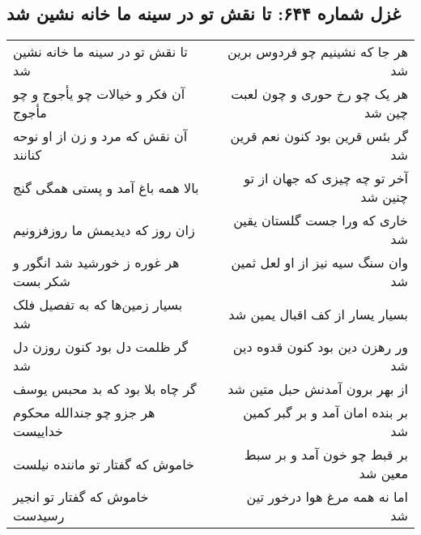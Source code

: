 \begin{center}
\section*{غزل شماره ۶۴۴: تا نقش تو در سینه ما خانه نشین شد}
\label{sec:0644}
\begin{longtable}{l p{0.5cm} r}
تا نقش تو در سینه ما خانه نشین شد
&&
هر جا که نشینیم چو فردوس برین شد
\\
آن فکر و خیالات چو یأجوج و چو مأجوج
&&
هر یک چو رخ حوری و چون لعبت چین شد
\\
آن نقش که مرد و زن از او نوحه کنانند
&&
گر بئس قرین بود کنون نعم قرین شد
\\
بالا همه باغ آمد و پستی همگی گنج
&&
آخر تو چه چیزی که جهان از تو چنین شد
\\
زان روز که دیدیمش ما روزفزونیم
&&
خاری که ورا جست گلستان یقین شد
\\
هر غوره ز خورشید شد انگور و شکر بست
&&
وان سنگ سیه نیز از او لعل ثمین شد
\\
بسیار زمین‌ها که به تفصیل فلک شد
&&
بسیار یسار از کف اقبال یمین شد
\\
گر ظلمت دل بود کنون روزن دل شد
&&
ور رهزن دین بود کنون قدوه دین شد
\\
گر چاه بلا بود که بد محبس یوسف
&&
از بهر برون آمدنش حبل متین شد
\\
هر جزو چو جندالله محکوم خداییست
&&
بر بنده امان آمد و بر گبر کمین شد
\\
خاموش که گفتار تو ماننده نیلست
&&
بر قبط چو خون آمد و بر سبط معین شد
\\
خاموش که گفتار تو انجیر رسیدست
&&
اما نه همه مرغ هوا درخور تین شد
\\
\end{longtable}
\end{center}
